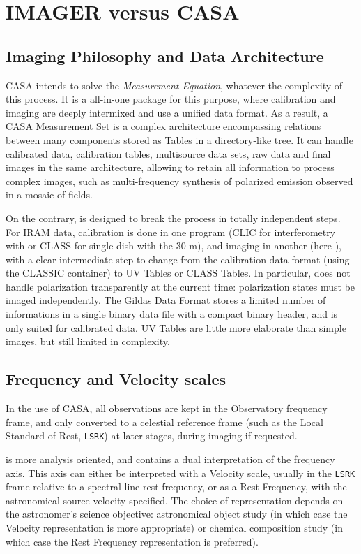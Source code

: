 \section{IMAGER versus CASA}
\label{app:imager-casa}

\subsection{Imaging Philosophy and Data Architecture}
CASA intends to solve the \textit{Measurement Equation}, whatever the
complexity of this process.  It is a all-in-one package for this purpose,
where calibration and imaging are deeply intermixed and use a
unified data format.
As a result, a CASA Measurement Set is a complex architecture
encompassing relations between many components stored as Tables
in a directory-like tree. It can handle calibrated data, calibration
tables, multisource data sets, raw data and final images
in the same architecture,
allowing to retain all information to process complex images, such
as multi-frequency synthesis of polarized emission observed in
a mosaic of fields.

On the contrary, \gildas{} is designed to break the process in 
totally independent steps. For IRAM data, calibration is done
in one program (CLIC for interferometry with \NOEMA{} or 
CLASS for single-dish with the 30-m),
and imaging in another (here \imager{}), with a clear intermediate step
to change from the calibration data format (using the CLASSIC container)
to UV Tables or CLASS Tables. In particular, \imager{} does not
handle polarization transparently at the current time: 
polarization states must be imaged independently.
The Gildas Data Format stores a limited
number of informations in a single binary data file with a compact binary
header, and is only suited for calibrated data.  UV Tables
are little more elaborate than simple images, but still limited
in complexity. 

\subsection{Frequency and Velocity scales}
In the \ALMA{} use of CASA, all observations are kept in the Observatory
frequency frame, and only converted to  a celestial reference frame
(such as the Local Standard of Rest, \texttt{LSRK}) at later stages, during
imaging if requested.

\gildas{} is more analysis oriented, and contains a dual interpretation 
of the frequency axis.  This axis can either be interpreted with
a Velocity scale, usually in the \texttt{LSRK} frame relative to a spectral
line rest frequency, or as a Rest Frequency, with the astronomical
source velocity specified. The choice of representation depends
on the astronomer's science objective:  astronomical object study
(in which case the Velocity representation is more appropriate)
or chemical composition study (in which case the Rest Frequency
representation is preferred).

